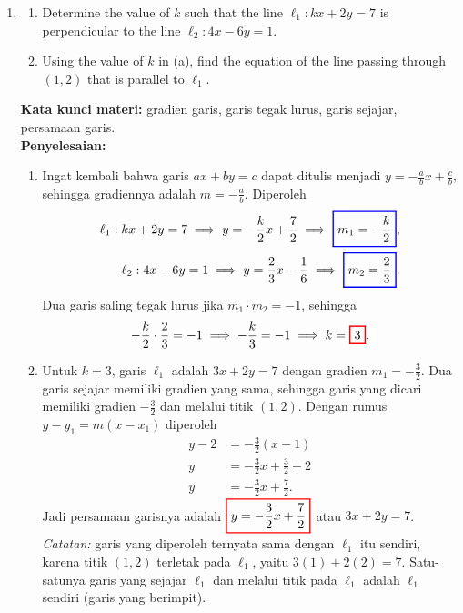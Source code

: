 \documentclass[10pt,openany,a4paper]{article}
\theoremstyle{definition}
\theoremstyle{definition}
\theoremstyle{plain}
\newenvironment{jawab}[2][tes]{%
\par\noindent\textbf{Kata kunci materi:} #1.\\
\textbf{Penyelesaian:} #2%
}{}
\begin{document}
\begin{enumerate}
    \item \begin{enumerate}
        \item Determine the value of $k$ such that the line $\ell_1: kx+2y=7$ is perpendicular to the line $\ell_2: 4x-6y=1$.
        \item Using the value of $k$ in (a), find the equation of the line passing through $(1,2)$ that is parallel to $\ell_1$.
    \end{enumerate}
    \begin{jawab}[gradien garis, garis tegak lurus, garis sejajar, persamaan garis]{
        \begin{enumerate}
            \item Ingat kembali bahwa garis $ax+by=c$ dapat ditulis menjadi $y=-\frac{a}{b}x+\frac{c}{b}$, sehingga gradiennya adalah $m=-\frac{a}{b}$. Diperoleh
            \begin{align*}
                \ell_1: kx+2y=7 \implies y = -\frac{k}{2}x + \frac{7}{2} \implies \colorlet{oldcolor}{.}
        \color{blue}
        \setlength{\fboxrule}{1pt} \boxed{\color{oldcolor}m_1 = -\frac{k}{2}}\color{oldcolor},\\
                \ell_2: 4x-6y=1 \implies y = \frac{2}{3}x - \frac{1}{6} \implies \colorlet{oldcolor}{.}
        \color{blue}
        \setlength{\fboxrule}{1pt} \boxed{\color{oldcolor}m_2 = \frac{2}{3}}\color{oldcolor}.
            \end{align*}
            Dua garis saling tegak lurus jika $m_1\cdot m_2=-1$, sehingga
            \begin{align*}
                -\frac{k}{2}\cdot\frac{2}{3} = -1 \implies -\frac{k}{3} = -1 \implies k=\colorlet{oldcolor}{.}
        \color{red}
        \setlength{\fboxrule}{1pt} \boxed{\color{oldcolor}3}\color{oldcolor}.
            \end{align*}
            \item Untuk $k=3$, garis $\ell_1$ adalah $3x+2y=7$ dengan gradien $m_1=-\frac{3}{2}$. Dua garis sejajar memiliki gradien yang sama, sehingga garis yang dicari memiliki gradien $-\frac{3}{2}$ dan melalui titik $(1,2)$. Dengan rumus $y - y_1 = m(x - x_1)$ diperoleh
            \begin{align*}
                y - 2 &= -\frac{3}{2}(x - 1)\\
                y &= -\frac{3}{2}x + \frac{3}{2} + 2\\
                y &= -\frac{3}{2}x + \frac{7}{2}.
            \end{align*}
            Jadi persamaan garisnya adalah $\colorlet{oldcolor}{.}
        \color{red}
        \setlength{\fboxrule}{1pt} \boxed{\color{oldcolor}y = -\frac{3}{2}x + \frac{7}{2}}\color{oldcolor}$ atau $3x+2y=7$.\\
            \textit{Catatan:} garis yang diperoleh ternyata sama dengan $\ell_1$ itu sendiri, karena titik $(1,2)$ terletak pada $\ell_1$, yaitu $3(1)+2(2)=7$. Satu-satunya garis yang sejajar $\ell_1$ dan melalui titik pada $\ell_1$ adalah $\ell_1$ sendiri (garis yang berimpit).
        \end{enumerate}
    }
    \end{jawab}


\end{enumerate}
\end{document}
